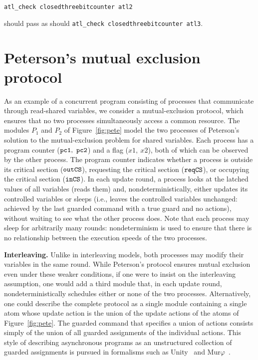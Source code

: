 \begin{verbatim}
atl_check closedthreebitcounter atl2
\end{verbatim}

\noindent
should pass as should {\tt atl\_check closedthreebitcounter atl3}. 


\section{Peterson's mutual exclusion protocol}

As an example of a concurrent program consisting of processes that
communicate through read-shared variables, we consider a mutual-exclusion
protocol, which ensures that no two processes simultaneously access a common
resource.
The modules $P_1$ and $P_2$ of Figure~\ref{fig:pete} model the two processes
of Peterson's solution to the mutual-exclusion problem for shared variables.
Each process  has a program counter ($\mbox{\tt pc1},~\mbox{\tt pc2}$) and a flag ($x1,~x2$), both
of which can be observed by the other process.
The program counter indicates whether a process is outside its critical
section ($\mbox{\tt outCS}$), requesting the critical section
($\mbox{\tt reqCS}$), or occupying the critical section ($\mbox{\tt inCS}$).
In each update round, a process looks at the latched values of all
variables (reads them) and, nondeterministically, either updates its controlled variables or sleeps
(i.e., leaves the controlled variables unchanged: achieved by the last
guarded command with a true guard and no actions), without waiting to see
what the other process does.
Note that each process may sleep for arbitrarily many rounds:
nondeterminism is used to ensure that there is no relationship between the
execution speeds of the two processes.

\mypar
{\bf Interleaving.}
Unlike in interleaving models, both processes may modify their variables in
the same round.
While Peterson's protocol ensures mutual exclusion even under these weaker
conditions, if one were to insist on the interleaving assumption, one would
add a third module that, in each update round, nondeterministically schedules
either or none of the two processes.
Alternatively, one could describe the complete protocol as a single module
containing a single atom whose update action is the union of the update
actions of the atoms of Figure~\ref{fig:pete}.
The guarded command that specifies a union of actions consists simply of the
union of all guarded assignments of the individual actions.
This style of describing asynchronous programs as an unstructured collection
of guarded assignments is pursued in formalisms such as
{\sc Unity}~\cite{ChandyMisra88} and {\sc Mur}$\varphi$~\cite{Dill96}.

